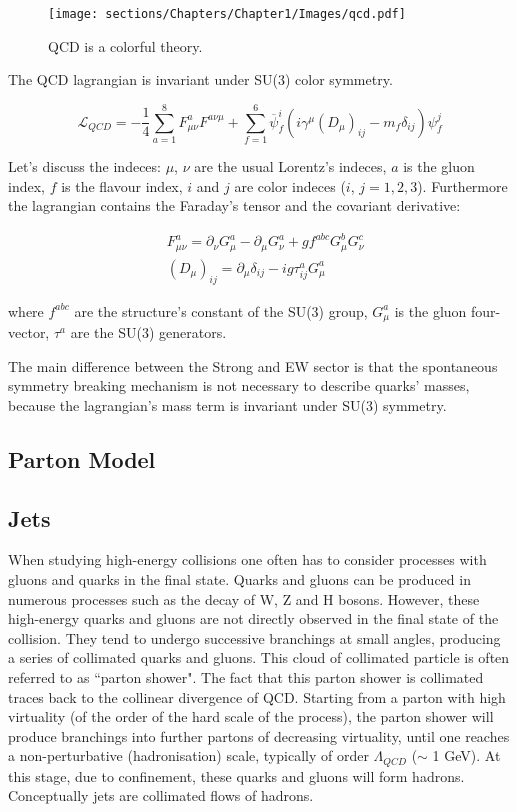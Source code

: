 \begin{figure}[h]
    \centering
    \texttt{[image: sections/Chapters/Chapter1/Images/qcd.pdf]}
    \caption{QCD is a colorful theory.}
\end{figure}

The QCD lagrangian is invariant under SU(3) color symmetry.

\begin{equation}
    \mathcal{L}_{QCD} = - \frac{1}{4} \sum_{a=1}^{8} F^a_{\mu \nu}F^{a \nu \mu} + \sum_{f=1}^{6} \overbar{\psi}_f^i
    (i \gamma^{\mu} (D_{\mu})_{ij} - m_f \delta_{ij}) \psi_f^j
\end{equation}

Let's discuss the indeces: $\mu$, $\nu$ are the usual Lorentz's indeces, $a$ is the gluon index, $f$ is the
flavour index, $i$ and $j$ are color indeces ($i$, $j = 1, 2, 3$).
Furthermore the lagrangian contains the Faraday's tensor and the covariant derivative:

\begin{align}
    &F^a_{\mu \nu} = \partial_{\nu} G^a_{\mu} - \partial_{\mu} G^a_{\nu} + g f^{abc}G_{\mu}^{b}G^c_{\nu} \\
    &(D_{\mu})_{ij} = \partial_{\mu} \delta_{ij} - i g \tau^a_{ij} G^a_{\mu}
\end{align}

where $f^{abc}$ are the structure's constant of the SU(3) group, $G^a_{\mu}$ is the gluon four-vector, 
$\tau^a$ are the SU(3) generators.

The main difference between the Strong and EW sector is that the spontaneous symmetry breaking 
mechanism is not necessary to describe quarks' masses, because the lagrangian's mass term is invariant 
under SU(3) symmetry.

\subsection{Parton Model}


\subsection{Jets}

When studying high-energy collisions one often has to consider processes with gluons and quarks in the final state.
Quarks and gluons can be produced in numerous processes such as the decay of W, Z and H bosons.
However, these high-energy quarks and gluons are not directly observed in the final state of the collision.
They tend to undergo successive branchings at small angles, producing a series of collimated quarks and gluons. 
This cloud of collimated particle is often referred to as “parton shower".
The fact that this parton shower is collimated traces back to the collinear divergence of QCD.
Starting from a parton with high virtuality (of the order of the hard scale of the process), 
the parton shower will produce branchings into further partons of decreasing virtuality, 
until one reaches a non-perturbative (hadronisation) scale, typically of order $\Lambda_{QCD}$ ($\sim$ 1 GeV).
At this stage, due to confinement, these quarks and gluons will form hadrons.
Conceptually jets are collimated flows of hadrons.

